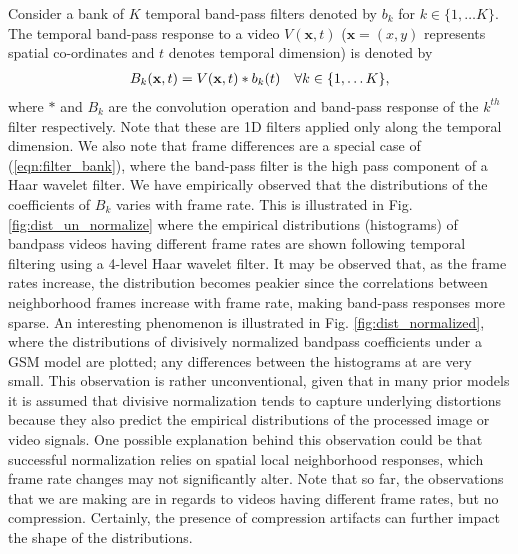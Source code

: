 \documentclass[journal]{IEEEtran}
\begin{document}
Consider a bank of $K$ temporal band-pass filters denoted by $b_k$ for $k \in \{1,\ldots K\}$. The temporal band-pass response to a video $V(\mathbf{x},t)$ ($\mathbf{x} = (x,y)$ represents spatial co-ordinates and $t$ denotes temporal dimension) is denoted by
\begin{align}
    B_k(\mathbf{x},t) = V(\mathbf{x},t)*b_k(t) \text{\hspace{10pt}} \forall k \in \{1,\ldots K\},
    \label{eqn:filter_bank}
\end{align}
where $*$ and $B_k$ are the convolution operation and band-pass response of the $k^{th}$ filter respectively. Note that these are 1D filters applied only along the temporal dimension. We also note that frame differences are a special case of (\ref{eqn:filter_bank}), where the band-pass filter is the high pass component of a Haar wavelet filter. We have empirically observed that the distributions of the coefficients of $B_k$ varies with frame rate. This is illustrated in Fig. \ref{fig:dist_un_normalize} where the empirical distributions (histograms) of bandpass videos having different frame rates are shown following temporal filtering using a 4-level Haar wavelet filter. It may be observed that, as the frame rates increase, the distribution becomes peakier since the correlations between neighborhood frames increase with frame rate, making band-pass responses more sparse. An interesting phenomenon is illustrated in Fig. \ref{fig:dist_normalized}, where the distributions of divisively normalized bandpass coefficients under a GSM model are plotted; any differences between the histograms at are very small. This observation is rather unconventional, given that in many prior models \cite{mittal2012no,mittal2013making,soundararajan2012video,bampis2017speed} it is assumed that divisive normalization tends to capture underlying distortions because they also predict the empirical distributions of the processed image or video signals. One possible explanation behind this observation could be that successful normalization relies on spatial local neighborhood responses, which frame rate changes may not significantly alter. Note that so far, the observations that we are making are in regards to videos having different frame rates, but no compression. Certainly, the presence of compression artifacts can further impact the shape of the distributions.
\end{document}

